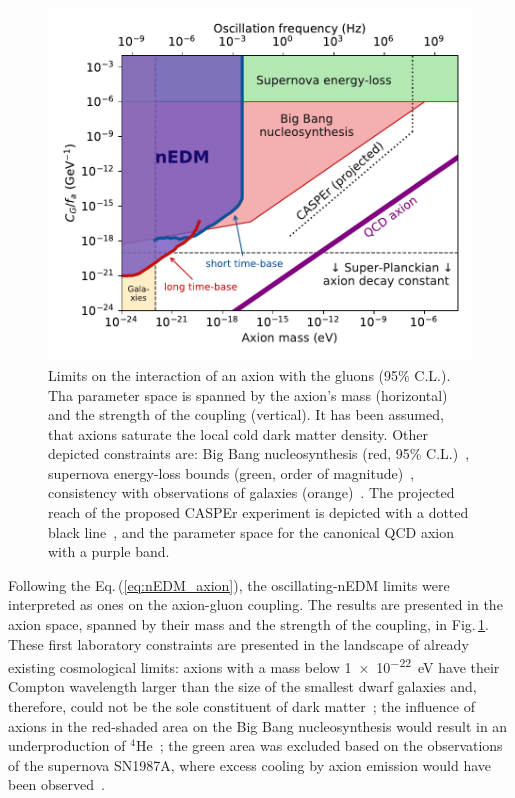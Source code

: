 \begin{figure}
  \centering
  \includegraphics[width=0.8\linewidth]{gfx/axions/psi_ill_axion_limits_v7.pdf}
  \caption{Limits on the interaction of an axion with the gluons (95\% C.L.). Tha parameter space is spanned by the axion's mass (horizontal) and the strength of the coupling (vertical). It has been assumed, that axions saturate the local cold dark matter density. Other depicted constraints are: Big Bang nucleosynthesis (red, 95\% C.L.)~\cite{Blum2014,StadnikThesis,Stadnik2015D}, supernova energy-loss bounds (green, order of magnitude)~\cite{Graham2013,Raffelt1990Review,Raffelt2008LNP}, consistency with observations of galaxies (orange)~\cite{Marsh2015Review,Marsh2015B,Schive2015,Marsh2017}. The projected reach of the proposed CASPEr experiment is depicted with a dotted black line~\cite{CASPEr2014}, and the parameter space for the canonical QCD axion with a purple band.}
\label{fig:axions_limits_coupling}
\end{figure}

Following the Eq.\,(\ref{eq:nEDM_axion}), the oscillating-nEDM limits were interpreted as ones on the axion-gluon coupling. The results are presented in the axion space, spanned by their mass and the strength of the coupling, in Fig.\,\ref{fig:axions_limits_coupling}. These first laboratory constraints are presented in the landscape of already existing cosmological limits: axions with a mass below \SI{1e-22}{\electronvolt} have their Compton wavelength larger than the size of the smallest dwarf galaxies and, therefore, could not be the sole constituent of dark matter~\cite{Marsh2015Review}; the influence of axions in the red-shaded area on the Big Bang nucleosynthesis would result in an underproduction of ${}^4$He~\cite{Blum2014}; the green area was excluded based on the observations of the supernova SN1987A, where excess cooling by axion emission would have been observed~\cite{Graham2013}.


